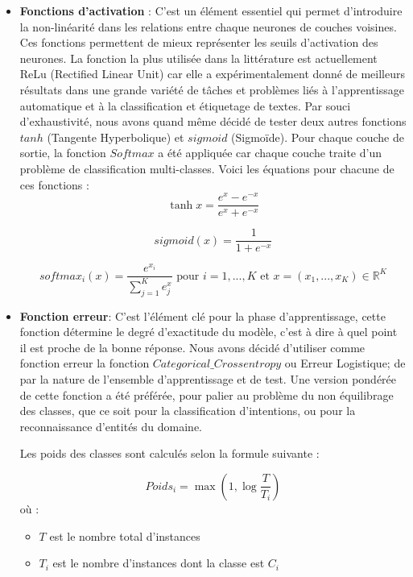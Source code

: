 \begin{itemize}
		\item \textbf{Fonctions d'activation} : 
		C'est un élément essentiel qui permet d'introduire la non-linéarité dans les relations entre chaque neurones de couches voisines. Ces fonctions permettent de mieux représenter les seuils d'activation des neurones. La fonction la plus utilisée dans la littérature est actuellement ReLu (Rectified Linear Unit) car elle a expérimentalement donné de meilleurs résultats dans une grande variété de tâches et problèmes liés à l'apprentissage automatique et à la classification et étiquetage de textes. Par souci d'exhaustivité, nous avons quand même décidé de tester deux autres fonctions $tanh$ (Tangente Hyperbolique) et $sigmoid$ (Sigmoïde). Pour chaque couche de sortie, la fonction $Softmax$ a été appliquée car chaque couche traite d'un problème de classification multi-classes. Voici les équations pour chacune de ces fonctions :
		\begin{equation*}
			\tanh{x} = \frac{e^{x}-e^{-x}}{e^x+e^{-x}}
		\end{equation*}
		
		\begin{equation*}
			sigmoid(x) = \frac{1}{1+e^{-x}}
		\end{equation*}
		
		\begin{equation*}
			softmax_i(x) = \frac{e^{x_i}}{\sum_{j=1}^{K}e{^x_j}} \text{ pour } i=1,...,K \text{ et } x=(x_1,...,x_K) \in \mathbb{R}^K
		\end{equation*}
		\item \textbf{Fonction erreur}:
		C'est l'élément clé pour la phase d'apprentissage, cette fonction détermine le degré d'exactitude du modèle, c'est à dire à quel point il est proche de la bonne réponse. Nous avons décidé d'utiliser comme fonction erreur la fonction $Categorical\_Crossentropy$ ou Erreur Logistique; de par la nature de l'ensemble d'apprentissage et de test. Une version pondérée de cette fonction a été préférée, pour palier au problème du non équilibrage des classes, que ce soit pour la classification d'intentions, ou pour la reconnaissance d'entités du domaine.\\
		\par
		Les poids des classes sont calculés selon la formule suivante : 
		
		\begin{equation*}
			Poids_i = \max(1,\log{\frac{T}{T_i}})
		\end{equation*}
		où :
		\begin{itemize}
			\item  $T$ est le nombre total d'instances
			\item  $T_i$ est le nombre d'instances dont la classe est $C_i$
		\end{itemize}
		

\end{itemize}
